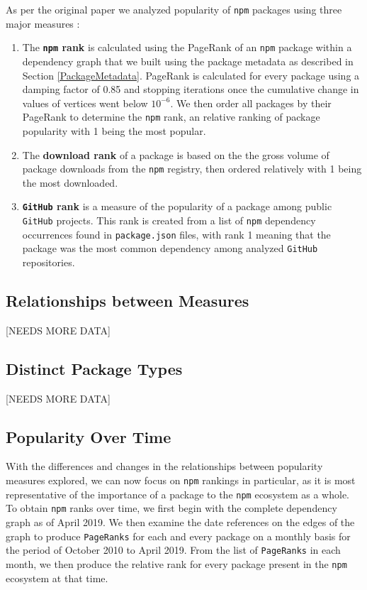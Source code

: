 \documentclass[10pt,conference]{IEEEtran}
\def\code#1{\texttt{#1}}
\begin{document}
As per the original paper we analyzed popularity of \code{npm} packages using three major measures \cite{Wittern:2016}:
\begin{enumerate}
  \item The \textbf{\code{npm} rank} is calculated using the PageRank\cite{brin1998anatomy} of an \code{npm} package within a dependency graph that we built using the
    package metadata as described in Section \ref{PackageMetadata}. PageRank is calculated for every package using a damping factor of 0.85 
    and stopping iterations once the cumulative change in values of vertices went below $10^{-6}$. We then order all packages by their PageRank to determine the
    \code{npm} rank, an relative ranking of package popularity with 1 being the most popular.
  \item The \textbf{download rank} of a package is based on the the gross volume of package downloads from the \code{npm}
    registry, then ordered relatively with 1 being the most downloaded.
  \item \textbf{\code{GitHub} rank} is a measure of the popularity of a package among public \code{GitHub} projects.
    This rank is created from a list of \code{npm} dependency occurrences found in \code{package.json} files, with rank 1
    meaning that the package was the most common dependency among analyzed \code{GitHub} repositories.  
\end{enumerate}


\subsection{Relationships between Measures}
[NEEDS MORE DATA]

\subsection{Distinct Package Types}
[NEEDS MORE DATA]

\subsection{Popularity Over Time}

With the differences and changes in the relationships between
popularity measures explored, we can now focus on \code{npm}
rankings in particular, as it is most representative of the 
importance of a package to the \code{npm} ecosystem as a whole.
To obtain \code{npm} ranks over time, we first begin with the
complete dependency graph as of April 2019. We then examine
the date references on the edges of the graph to produce \code{PageRanks}
for each and every package on a monthly basis for the period of October 2010
to April 2019. From the list of \code{PageRanks} in each month, we then
produce the relative rank for every package present in the \code{npm}
ecosystem at that time. 
\end{document}
